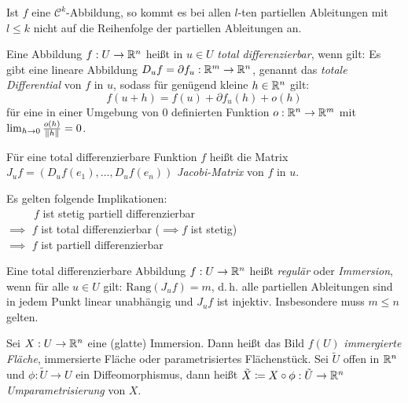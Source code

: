 \documentclass{cheat-sheet}
\begin{document}
\begin{satz}[Schwarz]
  Ist $f$ eine $\mathcal{C}^k$-Abbildung, so kommt es bei allen $l$-ten partiellen Ableitungen mit $l \leq k$ nicht auf die Reihenfolge der partiellen Ableitungen an.
\end{satz}

\begin{defn}
  Eine Abbildung $f : U \to \mathbb{R}^n$ heißt in $u \in U$ \emph{total differenzierbar}, wenn gilt: Es gibt eine lineare Abbildung $D_u f = \partial f_u : \mathbb{R}^m \to \mathbb{R}^n$, genannt das \emph{totale Differential} von $f$ in $u$, sodass für genügend kleine $h \in \mathbb{R}^n$ gilt:
  \[ f(u + h) = f(u) + \partial f_u(h) + o(h) \]
  für eine in einer Umgebung von $0$ definierten Funktion $o : \mathbb{R}^n \to \mathbb{R}^m$ mit $\lim_{h \to 0} \tfrac{o(h)}{\lVert h\rVert} = 0$.
\end{defn}

\begin{defn}
  Für eine total differenzierbare Funktion $f$ heißt die Matrix $J_u f = (D_u f(e_1), ..., D_u f(e_n))$ \emph{Jacobi-Matrix} von $f$ in $u$.
\end{defn}

\begin{bem}
Es gelten folgende Implikationen:\\
$\quad\quad\,\,\, f$ ist stetig partiell differenzierbar\\
$\implies$ $f$ ist total differenzierbar ($\!\implies f$ ist stetig)\\
$\implies$ $f$ ist partiell differenzierbar
\end{bem}


\begin{defn}
  Eine total differenzierbare Abbildung $f : U \to \mathbb{R}^n$ heißt \emph{regulär} oder \emph{Immersion}, wenn für alle $u \in U$ gilt: $\mathrm{Rang}(J_u f) = m$, d.\,h. alle partiellen Ableitungen sind in jedem Punkt linear unabhängig und $J_u f$ ist injektiv. Insbesondere muss $m \leq n$ gelten.
\end{defn}


\begin{defn}
  Sei $X : U \to \mathbb{R}^n$ eine (glatte) Immersion. Dann heißt das Bild $f(U)$ \emph{immergierte Fläche}, immersierte Fläche oder parametrisiertes Flächenstück. Sei $\tilde{U}$ offen in $\mathbb{R}^n$ und $\phi : \tilde{U} \to U$ ein Diffeomorphismus, dann heißt $\tilde{X} \coloneqq X \circ \phi : \tilde{U} \to \mathbb{R}^n$ \emph{Umparametrisierung} von $X$.
\end{defn}
\end{document}
